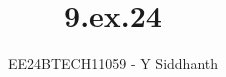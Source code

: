 \documentclass[journal]{IEEEtran}
\begin{document}
	
	
	\vspace{3cm}
	
	\title{9.ex.24}
	\author{EE24BTECH11059 - Y Siddhanth}
	{\let\newpage\relax\maketitle}
	
	\renewcommand{\thefigure}{\theenumi}
	\renewcommand{\thetable}{\theenumi}
	\setlength{\intextsep}{10pt} %
	
	
	\renewcommand{\thetable}{\theenumi}
	
\end{document}
